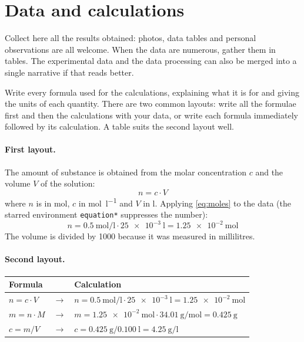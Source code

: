 \section{Data and calculations}
Collect here all the results obtained: photos, data tables and personal observations are all welcome. When the data are numerous, gather them in tables. The experimental data and the data processing can also be merged into a single narrative if that reads better.

Write every formula used for the calculations, explaining what it is for and giving the units of each quantity. There are two common layouts: write all the formulae first and then the calculations with your data, or write each formula immediately followed by its calculation. A table suits the second layout well.

\paragraph{First layout.}
The amount of substance is obtained from the molar concentration $c$ and the volume $V$ of the solution:
\begin{equation}
    n = c \cdot V
    \label{eq:moles} %
\end{equation}
where $n$ is in \unit{\mole}, $c$ in \unit{\mole\per\litre} and $V$ in \unit{\litre}. Applying \cref{eq:moles} to the data (the starred environment \texttt{equation*} suppresses the number):
\begin{equation*}
    n = \qty{0.5}{\mole\per\litre} \cdot \qty{25e-3}{\litre} = \qty{1.25e-2}{\mole}
\end{equation*}
The volume is divided by 1000 because it was measured in millilitres.

\paragraph{Second layout.}
\begin{center}
    \renewcommand{\arraystretch}{1.6} %
    \begin{tabular}{l c l}
        \toprule
        \textbf{Formula} &               & \textbf{Calculation}                                                                       \\
        \midrule
        $n = c \cdot V$  & $\rightarrow$ & $n = \qty{0.5}{\mole\per\litre} \cdot \qty{25e-3}{\litre} = \qty{1.25e-2}{\mole}$          \\
        $m = n \cdot M$  & $\rightarrow$ & $m = \qty{1.25e-2}{\mole} \cdot \qty{34.01}{\gram\per\mole} = \qty{0.425}{\gram}$          \\
        $c = m / V$      & $\rightarrow$ & $c = \qty{0.425}{\gram} / \qty{0.100}{\litre} = \qty{4.25}{\gram\per\litre}$               \\
        \bottomrule
    \end{tabular}
\end{center}

